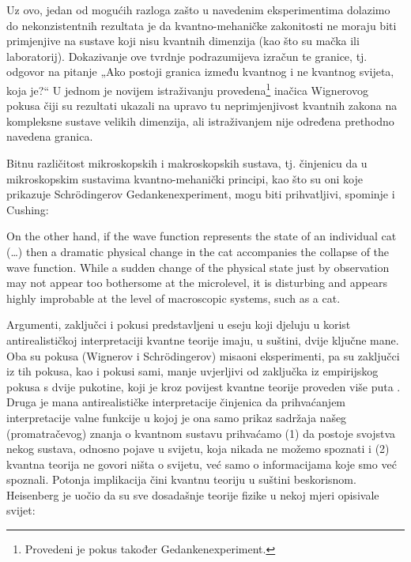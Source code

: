 \documentclass[twoside]{article}
\begin{document}
Uz ovo, jedan od mogućih razloga zašto u navedenim eksperimentima dolazimo do nekonzistentnih rezultata je da kvantno-mehaničke zakonitosti ne moraju biti primjenjive na sustave koji nisu kvantnih dimenzija (kao što su mačka ili laboratorij). Dokazivanje ove tvrdnje podrazumijeva izračun te granice, tj. odgovor na pitanje „Ako postoji granica između kvantnog i ne kvantnog svijeta, koja je?“ U jednom je novijem istraživanju\cite{Frauchiger2018} provedena\footnote{Provedeni je pokus također Gedankenexperiment.}  inačica Wignerovog pokusa čiji su rezultati ukazali na upravo tu neprimjenjivost kvantnih zakona na kompleksne sustave velikih dimenzija, ali istraživanjem nije određena prethodno navedena granica. 

Bitnu različitost mikroskopskih i makroskopskih sustava, tj. činjenicu da u mikroskopskim sustavima kvantno-mehanički principi, kao što su oni koje prikazuje Schrödingerov Gedankenexperiment, mogu biti prihvatljivi, spominje i Cushing:

\begin{displayquote}
On the other hand, if the wave function represents the state of an individual cat (…) then a dramatic physical change in the cat accompanies the collapse of the wave function. While a sudden change of the physical state just by observation may not appear too bothersome at the microlevel, it is disturbing and appears highly improbable at the level of macroscopic systems, such as a cat. \cite{Cushing2006}
\end{displayquote}

\noindent
Argumenti, zaključci i pokusi predstavljeni u eseju koji djeluju u korist antirealističkoj interpretaciji kvantne teorije imaju, u suštini, dvije ključne mane. Oba su pokusa (Wignerov i Schrödingerov) misaoni eksperimenti, pa su zaključci iz tih pokusa, kao i pokusi sami, manje uvjerljivi od zaključka iz empirijskog pokusa s dvije pukotine, koji je kroz povijest kvantne teorije proveden više puta \cite{Feynman2010}. Druga je mana antirealističke interpretacije činjenica da prihvaćanjem interpretacije valne funkcije u kojoj je ona samo prikaz sadržaja našeg (promatračevog) znanja o kvantnom sustavu prihvaćamo (1) da postoje svojstva nekog sustava, odnosno pojave u svijetu, koja nikada ne možemo spoznati i (2) kvantna teorija ne govori ništa o svijetu, već samo o informacijama koje smo već spoznali. Potonja implikacija čini kvantnu teoriju u suštini beskorisnom. Heisenberg je uočio da su sve dosadašnje teorije fizike u nekoj mjeri opisivale svijet: 
\end{document}
